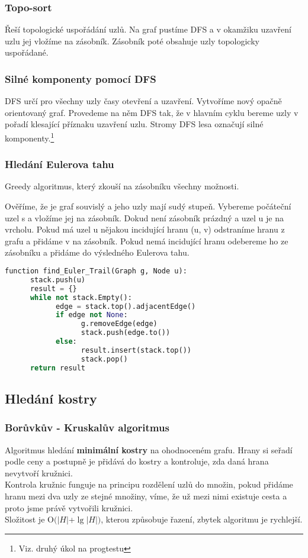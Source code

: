 \documentclass[12pt]{article}
\begin{document}
\subsubsection{Topo-sort}
Řeší topologické uspořádání uzlů. Na graf pustíme DFS a v okamžiku uzavření uzlu jej vložíme na zásobník. Zásobník poté obsahuje uzly topologicky uspořádané.

\subsubsection{Silné komponenty pomocí DFS}
DFS určí pro všechny uzly časy otevření a uzavření.
Vytvoříme nový opačně orientovaný graf.
Provedeme na něm DFS tak, že v hlavním cyklu bereme uzly v pořadí klesající příznaku uzavření uzlu.
Stromy DFS lesa označují silné komponenty.\footnote{Viz. druhý úkol na progtestu}

\subsubsection{Hledání Eulerova tahu}
Greedy algoritmus, který zkouší na zásobníku všechny možnosti.

Ověříme, že je graf souvislý a jeho uzly mají sudý stupeň. Vybereme počáteční uzel s a vložíme jej na zásobník. 
Dokud není zásobník prázdný a uzel u je na vrcholu.
Pokud má uzel u nějakou incidující hranu (u, v) odstraníme hranu z grafu a přidáme v na zásobník.
Pokud nemá incidující hranu odebereme ho ze zásobníku a přidáme do výsledného Eulerova tahu.

\begin{lstlisting}[language=python]
function find_Euler_Trail(Graph g, Node u):
      stack.push(u)
      result = {}
      while not stack.Empty():
            edge = stack.top().adjacentEdge()
            if edge not None:
                  g.removeEdge(edge)
                  stack.push(edge.to())
            else:
                  result.insert(stack.top())
                  stack.pop()
      return result
\end{lstlisting}


\subsection{Hledání kostry}
\subsubsection{Borůvkův - Kruskalův algoritmus}
Algoritmus hledání \textbf{minimální kostry} na ohodnoceném grafu. Hrany si seřadí podle ceny a postupně je přidává do kostry a kontroluje, zda daná hrana nevytvoří kružnici.\\
Kontrola kružnic funguje na principu rozdělení uzlů do množin, pokud přidáme hranu mezi dva uzly ze stejné množiny, víme, že už mezi nimi existuje cesta a proto jsme právě vytvořili kružnici.\\
Složitost je $\textrm{O}(\left|H\right|$+$\lg\left|H\right|)$, kterou způsobuje řazení, zbytek algoritmu je rychlejší.
\end{document}

